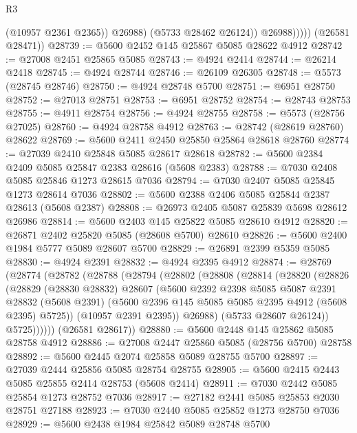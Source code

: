 \begin{lexlean}{R3}
\begin{coremodule}
                      (@10957 @2361 @2365))
                    @26988)
                  (@5733 @28462 @26124))
                @26988)))))
      (@26581 @28471))
@28739 := @5600 @2452 @145 @25867 @5085 @28622 @4912
@28742 := @27008 @2451 @25865 @5085
@28743 := @4924 @2414
@28744 := @26214 @2418
@28745 := @4924 @28744
@28746 := @26109 @26305
@28748 := @5573 (@28745 @28746)
@28750 := @4924 @28748 @5700
@28751 := @6951 @28750
@28752 := @27013 @28751
@28753 := @6951 @28752
@28754 := @28743 @28753
@28755 := @4911 @28754
@28756 := @4924 @28755
@28758 := @5573 (@28756 @27025)
@28760 := @4924 @28758 @4912
@28763 := @28742 (@28619 @28760) @28622
@28769 := @5600 @2411 @2450 @25850 @25864 @28618 @28760
@28774 := @27039 @2410 @25848 @5085 @28617 @28618
@28782 := @5600 @2384 @2409 @5085 @25847 @2383 @28616 (@5608 @2383)
@28788 := @7030 @2408 @5085 @25846 @1273 @28615 @7036
@28794 := @7030 @2407 @5085 @25845 @1273 @28614 @7036
@28802 := @5600 @2388 @2406 @5085 @25844 @2387 @28613 (@5608 @2387)
@28808 := @26973 @2405 @5087 @25839 @5698 @28612 @26986
@28814 := @5600 @2403 @145 @25822 @5085 @28610 @4912
@28820 := @26871 @2402 @25820 @5085 (@28608 @5700) @28610
@28826 := @5600 @2400 @1984 @5777 @5089 @28607 @5700
@28829 := @26891 @2399 @5359 @5085
@28830 := @4924 @2391
@28832 := @4924 @2395 @4912
@28874 := @28769
    (@28774
      (@28782
        (@28788
          (@28794
            (@28802
              (@28808
                (@28814
                  (@28820
                    (@28826
                      (@28829
                        (@28830 @28832)
                        @28607
                        (@5600
                          @2392
                          @2398
                          @5085
                          @5087
                          @2391
                          @28832
                          (@5608 @2391)
                          (@5600 @2396 @145 @5085 @5085 @2395 @4912 (@5608 @2395) @5725))
                        (@10957 @2391 @2395))
                      @26988)
                    (@5733 @28607 @26124))
                  @5725))))))
      (@26581 @28617))
@28880 := @5600 @2448 @145 @25862 @5085 @28758 @4912
@28886 := @27008 @2447 @25860 @5085 (@28756 @5700) @28758
@28892 := @5600 @2445 @2074 @25858 @5089 @28755 @5700
@28897 := @27039 @2444 @25856 @5085 @28754 @28755
@28905 := @5600 @2415 @2443 @5085 @25855 @2414 @28753 (@5608 @2414)
@28911 := @7030 @2442 @5085 @25854 @1273 @28752 @7036
@28917 := @27182 @2441 @5085 @25853 @2030 @28751 @27188
@28923 := @7030 @2440 @5085 @25852 @1273 @28750 @7036
@28929 := @5600 @2438 @1984 @25842 @5089 @28748 @5700

\end{coremodule}
\end{lexlean}
